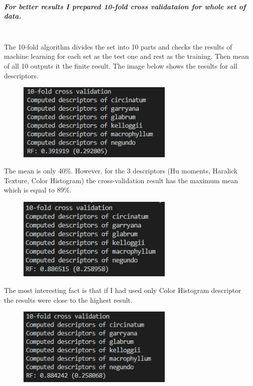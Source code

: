 \documentclass[12pt]{article}
\begin{document}
\subparagraph{
For better results I prepared 10-fold cross validataion for whole set of data.\\\\
}

The 10-fold algorithm divides the set into 10 parts and checks the results of machine learning for each set as the test one and rest as the training. Then mean of all 10 outputs it the finite result. The image below shows the results for all descriptors.

\begin{figure}[h!]
\centering
\includegraphics[width=3in]{Cross_1.png}
\end{figure}

The mean is only 40\%. However, for the 3 descriptors (Hu moments, Haralick Texture, Color Histogram) the cross-validation result has the maximum mean which is equal to 89\%.


\begin{figure}[h!]
\centering
\includegraphics[width=3in]{Cross_for3.png}
\end{figure}

The most interesting fact is that if I had used only Color Histogram descriptor the results were close to the highest result.

\begin{figure}[h!]
\centering
\includegraphics[width=3in]{Cross_histogram.png}
\end{figure}
\end{document}
